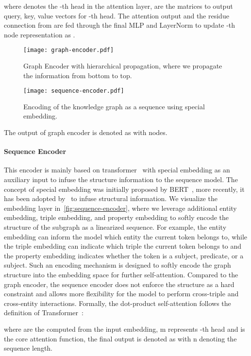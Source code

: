 \documentclass[11pt,a4paper]{article}
\begin{document}
where  denotes the -th head in the attention layer,  are the matrices to output query, key, value vectors for -th head. The attention output  and the residue connection from  are fed through the final MLP and LayerNorm to update -th node representation as . 
\begin{figure*}[!thb]
    \centering
    \texttt{[image: graph-encoder.pdf]}
    \caption{Graph Encoder with hierarchical propagation, where we propagate the information from bottom to top. }
    \label{fig:graph-encoder}
    \vspace{2ex}
    \texttt{[image: sequence-encoder.pdf]}
    \caption{Encoding of the knowledge graph as a sequence using special embedding. }
    \label{fig:sequence-encoder}
\end{figure*}
The output of graph encoder is denoted as  with  nodes.


\paragraph{Sequence Encoder}
This encoder is mainly based on transformer~\cite{vaswani2017attention} with special embedding as an auxiliary input to infuse the structure information to the sequence model. The concept of special embedding was initially proposed by BERT~\cite{devlin2019bert}, more recently, it has been adopted by~\citet{herzig2020tapas} to infuse structural information. We visualize the embedding layer in~\autoref{fig:sequence-encoder}, where we leverage additional entity embedding, triple embedding, and property embedding to softly encode the structure of the subgraph as a linearized sequence. For example, the entity embedding can inform the model which entity the current token belongs to, while the triple embedding can indicate which triple the current token belongs to and the property embedding indicates whether the token is a subject, predicate, or a subject. Such an encoding mechanism is designed to softly encode the graph structure into the embedding space for further self-attention. Compared to the graph encoder, the sequence encoder does not enforce the structure as a hard constraint and allows more flexibility for the model to perform cross-triple and cross-entity interactions. Formally, the dot-product self-attention follows the definition of Transformer~\cite{vaswani2017attention}:

where  are the computed from the input embedding, m represents -th head and  is the core attention function, the final output is denoted as  with n denoting the sequence length.  
\end{document}
